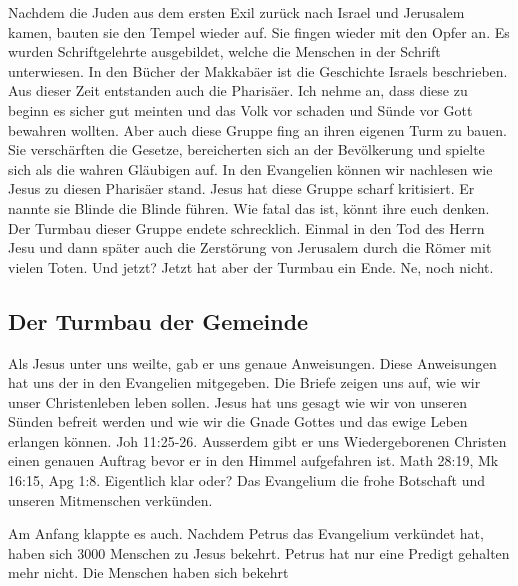 \documentclass[14pt]{../../inc/mybib}
\begin{document}
    Nachdem die Juden aus dem ersten Exil zurück nach Israel und Jerusalem kamen, bauten sie den Tempel wieder auf. Sie fingen wieder mit den Opfer an. Es wurden Schriftgelehrte ausgebildet, welche die Menschen in der Schrift unterwiesen. In den Bücher der Makkabäer ist die Geschichte Israels beschrieben. Aus dieser Zeit entstanden auch die Pharisäer. Ich nehme an, dass diese zu beginn es sicher gut meinten und das Volk vor schaden und Sünde vor Gott bewahren wollten. Aber auch diese Gruppe fing an ihren eigenen Turm zu bauen. Sie verschärften die Gesetze, bereicherten sich an der Bevölkerung und spielte sich als die wahren Gläubigen auf. In den Evangelien können wir nachlesen wie Jesus zu diesen Pharisäer stand. Jesus hat diese Gruppe scharf kritisiert. Er nannte sie Blinde die Blinde führen.  Wie fatal das ist, könnt ihre euch denken. Der Turmbau dieser Gruppe endete schrecklich. Einmal in den Tod des Herrn Jesu und dann später auch die Zerstörung von Jerusalem durch die Römer mit vielen Toten. Und jetzt? Jetzt hat aber der Turmbau ein Ende. Ne, noch nicht.

    \subsection{Der Turmbau der Gemeinde}
    Als Jesus unter uns weilte, gab er uns genaue Anweisungen. Diese Anweisungen hat uns der \herr{} in den Evangelien mitgegeben. Die Briefe zeigen uns auf, wie wir unser Christenleben leben sollen. Jesus hat uns gesagt wie wir von unseren Sünden befreit werden und wie wir die Gnade Gottes und das ewige Leben erlangen können. Joh 11:25-26. Ausserdem gibt er uns Wiedergeborenen Christen einen genauen Auftrag bevor er in den Himmel aufgefahren ist. Math 28:19, Mk 16:15, Apg 1:8. Eigentlich klar oder? Das Evangelium die frohe Botschaft und unseren Mitmenschen verkünden.

    Am Anfang klappte es auch. Nachdem Petrus das Evangelium verkündet hat, haben sich 3000 Menschen zu Jesus bekehrt. Petrus hat nur eine Predigt gehalten mehr nicht. Die Menschen haben sich bekehrt
    

    
\end{document}
